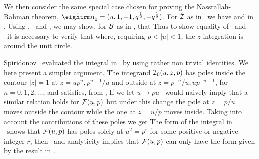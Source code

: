 We then consider the same special case 
chosen for proving the Nassrallah-Rahman theorem,
$\hu_0=(u,1,-1,q^{1\over 2},-q^{1\over 2})$.
For ${\hat{\cal I}}$ as in \ we have 
\eqn{}
and in \IA,
\eqn{}
Using \ido, \idtw\ and \idth, we may show, for ${\cal B}$ as in \indexm, that
\eqn{}
Thus to show equality of \intA\ and \intB\ it is necessary to verify that
\eqn{}
where, requiring  $p<|u|<1$, the $z$-integration is around the unit circle.

Spiridonov \spi\ evaluated the integral in \whatshow\ by using rather non trivial 
identities. We here present a simpler argument. The integrand ${\cal I}_0(u,z,p)$
has poles inside the contour $|z|=1$ at $z=up^n, p^{n+1}/u$ and outside
at $z=p^{-n}/u, u p^{-n-1}$, for $n=0,1,2,\dots$, and satisfies, from \thid,
\eqn{}
If we let $u\to p u$ \Izid\ would naively imply that a similar relation 
holds for ${\cal F}(u,p)$ but under this change the pole at $z=p/u$ moves outside
the contour while the one at $z=u/p$ moves inside. Taking into account
the contributions of these poles we get
\eqn{}
The form of the integral in \whatshow\ shows that ${\cal F}(u,p)$  has poles solely at 
$u^2 = p^r$ for some positive or negative integer $r$, then \Fdiff\ and analyticity 
implies that ${\cal F}(u,p)$ can only have the form given by the result in \whatshow.

\listrefs

\bye




